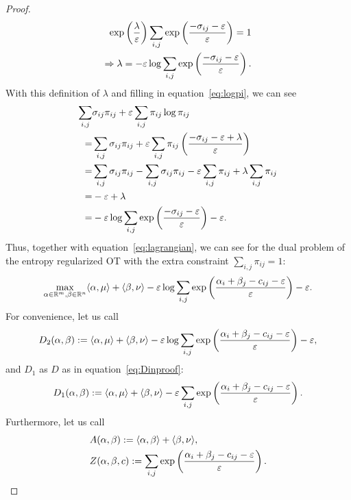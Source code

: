 \begin{proof}
\begin{align*}
		\exp\left(\frac{\lambda}{\varepsilon}\right) \sum_{i,j} \exp\left(\frac{-\sigma_{ij} - \varepsilon}{\varepsilon}\right) = 1 \\
		\Rightarrow \lambda  = -\varepsilon \log \sum_{i,j} \exp \left(\frac{-\sigma_{ij} - \varepsilon }{\varepsilon}\right) . 
	\end{align*}
	With this definition of $\lambda$ and filling in equation~\eqref{eq:logpi}, we can see
	\begin{align*}
		\sum_{i,j}& \sigma_{ij} \pi_{ij} + \varepsilon \sum_{i,j} \pi_{ij}\log \pi_{ij} \\ 
		= & \sum_{i,j} \sigma_{ij} \pi_{ij} + \varepsilon \sum_{i,j} \pi_{ij}\left(\frac{-\sigma_{ij} - \varepsilon + \lambda}{\varepsilon}\right) \\
		= & \sum_{i,j}\sigma_{ij} \pi_{ij} - \sum_{i,j}\sigma_{ij} \pi_{ij} - \varepsilon \sum_{i,j}\pi_{ij} + \lambda \sum_{i,j} \pi_{ij} \\ 
		= & -\varepsilon + \lambda  \\ 
		= & -\varepsilon \log \sum_{i,j} \exp \left(\frac{-\sigma_{ij} - \varepsilon}{\varepsilon}\right) - \varepsilon. 
	\end{align*}
	Thus, together with equation~\eqref{eq:lagrangian}, we can see for the dual problem of the entropy regularized OT with the extra constraint $\sum_{i,j} \pi_{ij} = 1$:
	\begin{equation*}
		\max_{\alpha \in \mathbb{R}^m, \beta\in \mathbb{R}^n} \langle \alpha, \mu \rangle + \langle \beta, \nu \rangle -\varepsilon \log \sum_{i,j} \exp \left(\frac{\alpha_i + \beta_j - c_{ij} - \varepsilon }{\varepsilon}\right) - \varepsilon. 
	\end{equation*}
	For convenience, let us call 
	\begin{equation}
		D_2 (\alpha, \beta) := \langle \alpha, \mu \rangle + \langle \beta, \nu \rangle -\varepsilon \log \sum_{i,j} \exp \left(\frac{\alpha_i + \beta_j - c_{ij} - \varepsilon }{\varepsilon}\right) - \varepsilon,
	\end{equation}
	and $D_1$ as $D$ as in equation~\eqref{eq:Dinproof}: 
	\begin{equation}
		D_1 (\alpha, \beta) := \langle \alpha, \mu \rangle + \langle \beta, \nu \rangle -\varepsilon \sum_{i,j} \exp \left(\frac{\alpha_i + \beta_j - c_{ij} - \varepsilon }{\varepsilon}\right).
	\end{equation}
	Furthermore, let us call 
	\begin{align*}
		&A(\alpha, \beta) := \langle \alpha, \beta \rangle + \langle \beta, \nu \rangle, \\ &Z (\alpha, \beta, c) := \sum_{i,j} \exp \left(\f{\alpha_i + \beta_j - c_{ij} - \varepsilon }{\varepsilon}\right).

\end{align*}
\end{proof}
